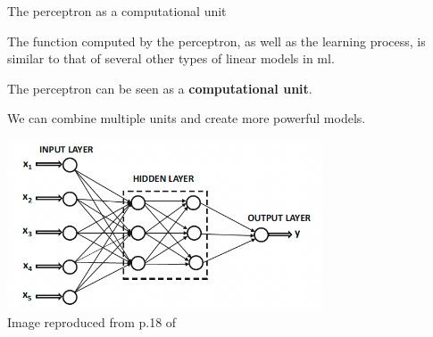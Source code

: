 
%
%
%

\begin{frame}[t]{The perceptron as a computational unit}

    The function computed by the \gls{perceptron},
    as well as the learning process, is similar to that of several
    other types of \glspl{linear model} in \gls{ml}.
    
    The \gls{perceptron} can be seen as a {\bf computational unit}.
    
    We can combine multiple units and create more powerful models.
    
    \begin{center}
        \includegraphics[width=0.70\textwidth]{./images/perceptron/combining_units.png}\\
        {\scriptsize \color{col:attribution} 
        Image reproduced from p.18 of \cite{Aggarwal:2018SpringerDL}}\\
     \end{center}
    
    
\end{frame}
